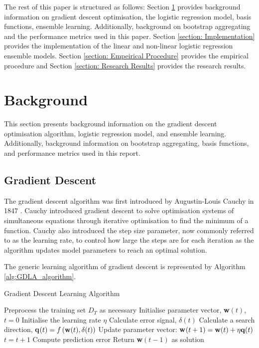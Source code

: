 \documentclass[10pt, conference]{IEEEtran}
\begin{document}
The rest of this paper is structured as follows: Section \ref{section: Background} provides background
information on gradient descent optimisation, the logistic regression model, basis functions, ensemble learning.
Additionally, background on bootstrap aggregating and the performance metrics used in this paper.
Section \ref{section: Implementation} provides the implementation of the linear and non-linear logistic
regression ensemble models. Section \ref{section: Empeirical Procedure} provides the empirical procedure and Section
\ref{section: Research Results} provides the research results.

\section{Background} \label{section: Background}

This section presents background information on the gradient descent optimisation algorithm, logistic
regression model, and ensemble learning. Additionally, background information on bootstrap aggregating,
basis functions, and performance metrics used in this report.

\subsection{Gradient Descent}

The gradient descent algorithm was first introduced by Augustin-Louis Cauchy
in 1847 \cite{gradient_descent_ref}. Cauchy introduced gradient descent to solve optimisation
systems of simultaneous equations through iterative optimisation to find the minimum of a function.
Cauchy also introduced the step size parameter, now commonly referred to as the learning rate, to control
how large the steps are for each iteration as the algorithm updates model parameters to reach an optimal
solution.

The generic learning algorithm of gradient descent is represented by Algorithm \ref{alg:GDLA_algorithm}.
\begin{algorithm}[H]
    \caption{Gradient Descent Learning Algorithm}
    \label{alg:GDLA_algorithm}
    \begin{algorithmic}[1]
        \State Preprocess the training set $D_T$ as necessary
        \State Initialise parameter vector, \textbf{w}$(t)$, $t=0$
        \State Initialise the learning rate $\eta$
                \State Calculate error signal, $\delta(t)$
                \State Calculate a search direction, \textbf{q}$(t) = f\left( \text{\textbf{w}}(t), \delta(t) \right)$
                \State Update parameter vector: \textbf{w}$(t+1) = \text{\textbf{w}}(t) + \eta \text{\textbf{q}}(t)$
            \EndFor
            \State $t = t + 1$
            \State Compute prediction error
        \EndWhile
        \State Return \textbf{w}$(t-1)$ as solution
    \end{algorithmic}
\end{algorithm}
\end{document}
